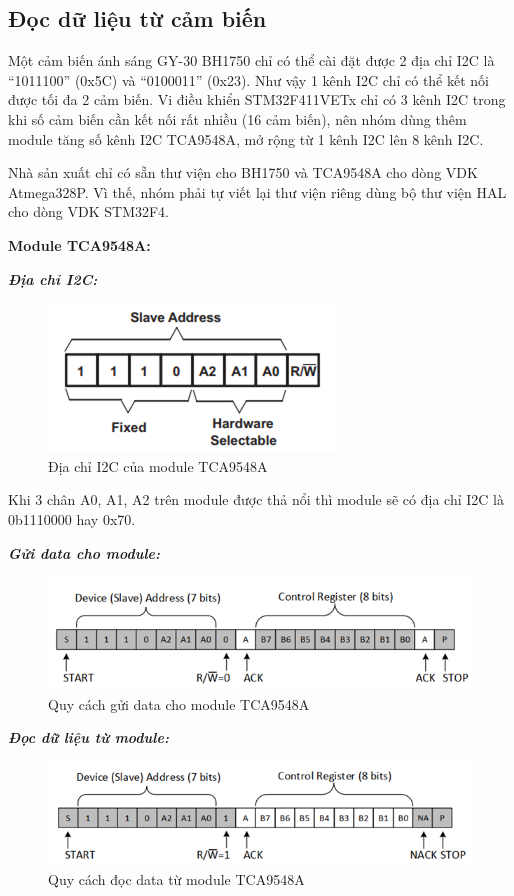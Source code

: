 \subsection{Đọc dữ liệu từ cảm biến}
Một cảm biến ánh sáng GY-30 BH1750 chỉ có thể cài đặt được 2 địa chỉ I2C là “1011100” (0x5C) và “0100011” (0x23). Như vậy 1 kênh I2C chỉ có thể kết nối được tối đa 2 cảm biến. Vi điều khiển STM32F411VETx chỉ có 3 kênh I2C trong khi số cảm biến cần kết nối rất nhiều (16 cảm biến), nên nhóm dùng thêm module tăng số kênh I2C TCA9548A, mở rộng từ 1 kênh I2C lên 8 kênh I2C.

Nhà sản xuất chỉ có sẵn thư viện cho BH1750 và TCA9548A cho dòng VDK  Atmega328P. Vì thế, nhóm phải tự viết lại thư viện riêng dùng bộ thư viện HAL cho dòng VDK STM32F4.

\textbf{Module TCA9548A:}

\textbf{\textit{Địa chỉ I2C:}}
\begin{figure}[H]
	\centering
	\includegraphics[scale=1]{Chapters/Chapter5/Images/AddressTCA}
	\caption{Địa chỉ I2C của module TCA9548A}
	\label{fig:C5AddressTCA}
\end{figure}

Khi 3 chân A0, A1, A2 trên module được thả nổi thì module sẽ có địa chỉ I2C là 0b1110000 hay 0x70.

\textbf{\textit{Gửi data cho module:}}
\begin{figure}[H]
	\centering
	\includegraphics[scale=0.9]{Chapters/Chapter5/Images/SendDataTCA.png}
	\caption{Quy cách gửi data cho module TCA9548A}
	\label{fig:C5SendDataTCA}
\end{figure}

\textbf{\textit{Đọc dữ liệu từ module:}}
\begin{figure}[H]
	\centering
	\includegraphics[scale=0.9]{Chapters/Chapter5/Images/ReadDataTCA.png}
	\caption{Quy cách đọc data từ module TCA9548A}
	\label{fig:C5ReadDataTCA}
\end{figure}

